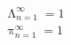 \documentclass{article}
\DeclareMathOperator*{\hugeLambda}{\Lambda}
\DeclareMathOperator*{\hugePi}{\pi}
\begin{document}
\begin{align}
  & \hugeLambda_{n=1}^\infty = 1\\
  & \hugePi_{n=1}^\infty = 1
\end{align}
\end{document}
